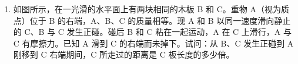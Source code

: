 \documentclass[\gkver]{gaokaozhenti}
\begin{document}
\begin{enumerate}
{$R=\frac{l}{\sqrt{2}}$ ②

以 $E$ 表示电场强度的大小，$a$ 表示粒子在电场中加速度的大小，$t_{E}$ 表示粒子在电场中由 P 点运动到 Q 点经过的时间，则有

$qE=ma$ ③

$R=\frac{1}{2}at_{E}^{2}$ ④

$R=v_{0}t_{E}$ ⑤

由以上各式，得

$E=\sqrt{2}\frac{qB^{2}l}{m}$ ⑥

（2）因粒子在磁场中由 P 点运动到 Q 点的轨迹为 $\frac{1}{4}$ 圆周，故运动经历的时间 $t_{B}$ 为圆周运动周期 $T$ 的 $\frac{1}{4}$，即有

$t_{B}=\frac{1}{4}T$ ⑦

而

$T=\frac{2\pi R}{v_{0}}$ ⑧

由⑦⑧和①式得

$t_{B}=\frac{\pi m}{2qB}$

由①⑤两式得 $t_{E}=\frac{m}{qB}$ ⑨

故经历的时间差为 $t_{B}-t_{E}=\left(\frac{\pi}{2}-1\right)\frac{m}{qB}$。
}

\item
如图所示，在一光滑的水平面上有两块相同的木板 B 和 C。重物 A（视为质点）位于 B 的右端，A、B、C 的质量相等。现 A 和 B 以同一速度滑向静止的 C、B 与 C 发生正碰。碰后 B 和 C 粘在一起运动，A 在 C 上滑行，A 与 C 有摩擦力。已知 A 滑到 C 的右端而未掉下。试问：从 B、C 发生正碰到 A 刚移到 C 右端期间，C 所走过的距离是 C 板长度的多少倍。
\onepicture[align=right, w=10.50cm]{}

\end{enumerate}
\end{document}
